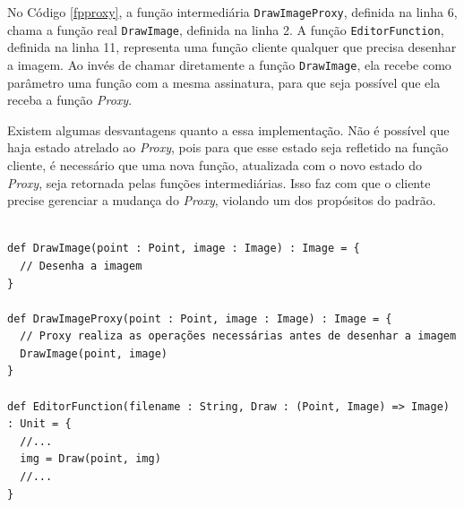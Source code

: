 No Código \ref{fpproxy}, a função intermediária 
\texttt{DrawImageProxy}, definida na linha 6, chama a 
função real \texttt{DrawImage}, definida na linha 2. 
A função \texttt{EditorFunction}, definida na linha 11, 
representa uma função cliente qualquer que 
precisa desenhar a imagem. Ao invés de chamar 
diretamente a função \texttt{DrawImage}, ela recebe 
como parâmetro uma função com a mesma assinatura, 
para que seja possível que ela receba a função 
\textit{Proxy}.

Existem algumas desvantagens quanto a essa 
implementação. Não é possível que haja 
estado atrelado ao \textit{Proxy}, pois para que 
esse estado seja refletido na função 
cliente, é necessário que uma nova função, 
atualizada com o novo estado do \textit{Proxy}, seja 
retornada pelas funções intermediárias. 
Isso faz com que o cliente precise gerenciar 
a mudança do \textit{Proxy}, violando 
um dos propósitos do padrão. 

\begin{lstlisting}[caption={\textit{Proxy} Funcional.},label=fpproxy]
    
def DrawImage(point : Point, image : Image) : Image = {
  // Desenha a imagem
}

def DrawImageProxy(point : Point, image : Image) : Image = {
  // Proxy realiza as operações necessárias antes de desenhar a imagem
  DrawImage(point, image)
}

def EditorFunction(filename : String, Draw : (Point, Image) => Image) : Unit = {
  //...
  img = Draw(point, img)
  //...
}
    
\end{lstlisting}
